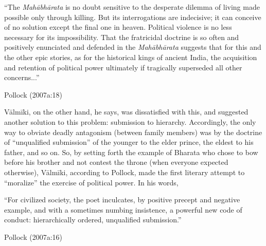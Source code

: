 \begin{myquote}
“The {\sl Mahābhārata} is no doubt sensitive to the desperate dilemma of living made possible only through killing. But its interrogations are indecisive; it can conceive of no solution except the final one in heaven. Political violence is no less necessary for its impossibility. That the fratricidal doctrine is so often and positively enunciated and defended in the {\sl Mahābhārata} suggests that for this and the other epic stories, as for the historical kings of ancient India, the acquisition and retention of political power ultimately if tragically superseded all other concerns...”

\hfill Pollock (2007a:18) 
\end{myquote}

Vālmīki, on the other hand, he says, was dissatisfied with this, and suggested another solution to this problem: submission to hierarchy. Accordingly, the only way to obviate deadly antagonism (between family members) was by the doctrine of “unqualified submission” of the younger to the elder prince, the eldest to his father, and so on. So, by setting forth the example of Bharata who chose to bow before his brother and not contest the throne (when everyone expected otherwise), Vālmīki, according to Pollock, made the first literary attempt to “moralize” the exercise of political power. In his words,

\begin{myquote}
“For civilized society, the poet inculcates, by positive precept and negative example, and with a sometimes numbing insistence, a powerful new code of conduct: hierarchically ordered, unqualified submission.''

\hfill Pollock (2007a:16)
\end{myquote}

